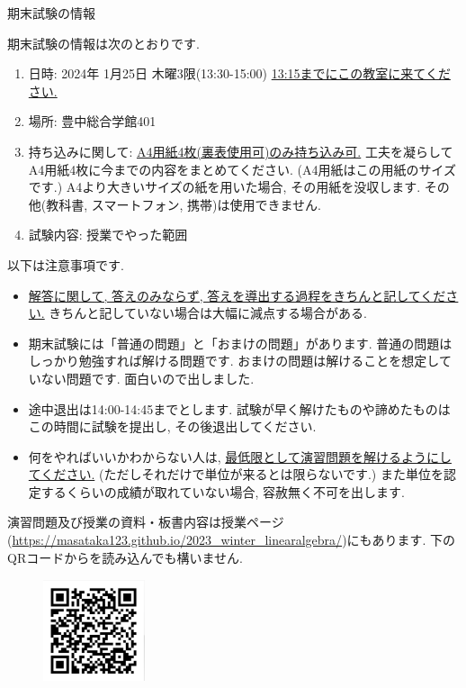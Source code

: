 \documentclass[dvipdfmx,a4paper,11pt]{article}
\theoremstyle{definition}
\begin{document}
\pagestyle{empty}




\begin{center}
{\LARGE 期末試験の情報 } \\
\end{center}

期末試験の情報は次のとおりです. 
\begin{enumerate}
\item 日時: 2024年 1月25日 木曜3限(13:30-15:00) \underline{13:15までにこの教室に来てください.}
\item 場所: 豊中総合学館401
\item 持ち込みに関して: \underline{A4用紙4枚(裏表使用可)のみ持ち込み可.} 工夫を凝らしてA4用紙4枚に今までの内容をまとめてください. (A4用紙はこの用紙のサイズです.) A4より大きいサイズの紙を用いた場合, その用紙を没収します. その他(教科書, スマートフォン, 携帯)は使用できません.
\item 試験内容: 授業でやった範囲
\end{enumerate}

以下は注意事項です.
\begin{itemize}
  \setlength{\parskip}{0cm} 
 
 \item \underline{解答に関して, 答えのみならず, 答えを導出する過程をきちんと記してください.} きちんと記していない場合は大幅に減点する場合がある.
 \item 期末試験には「普通の問題」と「おまけの問題」があります. 普通の問題はしっかり勉強すれば解ける問題です. おまけの問題は解けることを想定していない問題です. 面白いので出しました.  

\item 途中退出は14:00-14:45までとします. 試験が早く解けたものや諦めたものはこの時間に試験を提出し, その後退出してください. 
\item 何をやればいいかわからない人は, \underline{最低限として演習問題を解けるようにしてください.} (ただしそれだけで単位が来るとは限らないです.) また単位を認定するくらいの成績が取れていない場合, 容赦無く不可を出します.
\end{itemize}


演習問題及び授業の資料・板書内容は授業ページ(\url{https://masataka123.github.io/2023_winter_linearalgebra/})にもあります. 
下のQRコードからを読み込んでも構いません.
 \vspace{11pt}
\begin{figure}[h]
  \centering
 \includegraphics[height=30mm, width=30mm]{linalg.png}
\end{figure}
\end{document}
